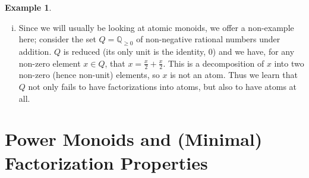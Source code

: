 \documentclass{report}
\newcommand{\F}{\mathscr{F}}
\newcommand{\NN}{\mathbb{N}}
\renewcommand{\:}{\text{:}}
\theoremstyle{definition}
\newtheorem{eg}[defn]{Example}
\begin{document}
\begin{eg}
\begin{enumerate}[(i)]
\begin{itemize}
\item \textit{Monoids of zero-sum sequences}: for a finite abelian group $G$, this monoid consists of formal words or ``sequences" in the elements of $G$ whose sums are equal to $0$.  
The interest in these monoids can be traced back to the study of the class group of a Dedekind domain (usually a ring of integers of a number field).  \textcolor{red}{[CITE SOME PAPERS]}

\item \textit{Integer-valued polynomials}: let $D$ be a domain with field of fractions $K$; then $\operatorname{Int}(D) := \{f(x) \in K[x]: f(D) \subseteq D \}$ is the ring of integer-valued polynomials of $D$.
In addition to the rich theory developed around understanding the prime ideal structure of this ring, it is amenable to the study of factorization behavior, and exhibits some surprising behaviors.  
For example, any finite subset of $\NN_{\ge2}$ can be realized as the set of factorization lengths of some polynomial $f(x)\in \operatorname{Int}(D)$.
Additionally, one can pose similar questions regarding the ring $\operatorname{Int}^\text{R}(D)$ of integer-valued rational functions. \textcolor{red}{[CITE SOME PAPERS]}
\end{itemize}
\item Since we will usually be looking at atomic monoids, we offer a non-example here; consider the set $Q = \mathbb{Q}_{\ge 0}$ of non-negative rational numbers under addition.
$Q$ is reduced (its only unit is the identity, $0$) and we have, for any non-zero element $x\in Q$, that $x = \frac{x}{2} + \frac{x}{2}$.
This is a decomposition of $x$ into two non-zero (hence non-unit) elements, so $x$ is not an atom.
Thus we learn that $Q$ not only fails to have factorizations into atoms, but also to have atoms at all.
\end{enumerate}
\end{eg}

\chapter{Power Monoids and (Minimal) Factorization Properties} \label{ch:power monoids}
\end{document}
